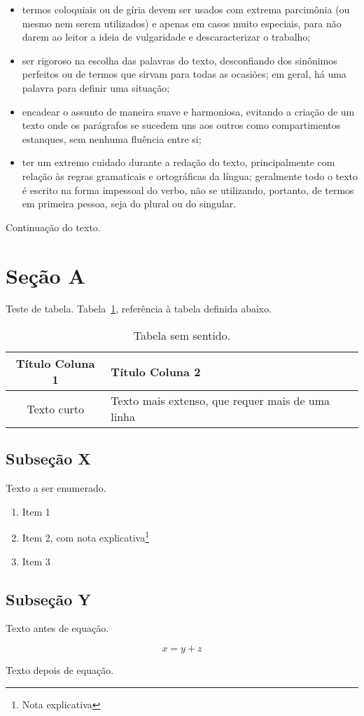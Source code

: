 \begin{itemize}
   \item termos coloquiais ou de gíria devem ser usados com extrema parcimônia (ou mesmo nem serem utilizados) e apenas em casos muito especiais, para não darem ao leitor a ideia de vulgaridade e descaracterizar o trabalho;
   \item ser rigoroso na escolha das palavras do texto, desconfiando dos sinônimos perfeitos ou de termos que sirvam para todas as ocasiões; em geral, há uma palavra para definir uma situação;
   \item encadear o assunto de maneira suave e harmoniosa, evitando a criação de um texto onde os parágrafos se sucedem uns aos outros como compartimentos estanques, sem nenhuma fluência entre si;
   \item ter um extremo cuidado durante a redação do texto, principalmente com relação às regras gramaticais e ortográficas da língua; geralmente todo o texto é escrito na forma impessoal do verbo, não se utilizando, portanto, de termos em primeira pessoa, seja do plural ou do singular.
\end{itemize}

Continuação do texto.


\section{Seção A}

Teste de tabela. Tabela~\ref{tab:TabelaSemSentido}, referência à tabela definida abaixo.

\begin{table}[!htb]
   \caption{Tabela sem sentido.}
   \centering
   \medskip
   \begin{tabular}{c|p{4cm}}
      \hline
      \textbf{Título Coluna 1} & \textbf{Título Coluna 2} \\
      \hline
      Texto curto & Texto mais extenso, que requer mais de uma linha \\
      \hline
   \end{tabular}
   \label{tab:TabelaSemSentido}
\end{table}



\subsection{Subseção X}


Texto a ser enumerado.

\begin{enumerate}
   \item Item 1
   \item Item 2, com nota explicativa\footnote{Nota explicativa}
   \item Item 3
\end{enumerate}


\subsection{Subseção Y}

Texto antes de equação.

\begin{equation}
   x = y + z
\end{equation}

Texto depois de equação.